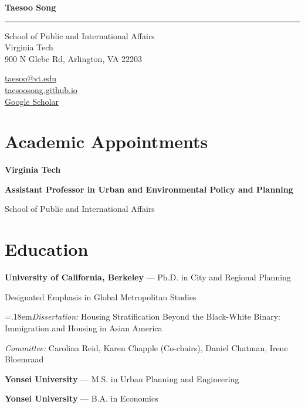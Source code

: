 \documentclass[11pt,letterpaper]{article}
\newcommand{\spitem}{\Needspace{2.6\baselineskip}\item} %
\newcommand{\term}[1]{(#1)}
\newcommand{\namefont}[1]{{\normalfont\bfseries\Huge #1}}
\begin{document}
\raggedright

\namefont{Taesoo Song}
\noindent\rule{\linewidth}{0.8pt}

\begin{minipage}[t]{0.66\textwidth}
School of Public and International Affairs\\
Virginia Tech\\
900 N Glebe Rd, Arlington, VA 22203
\end{minipage}
\begin{minipage}[t]{0.33\textwidth}
\raggedleft
\href{mailto:taesoo@vt.edu}{taesoo@vt.edu}\\
\href{https://taesoosong.github.io}{taesoosong.github.io}\\
\href{https://scholar.google.com/citations?user=2VUTbVcAAAAJ}{Google Scholar}
\end{minipage}

\section{Academic Appointments}
\noindent\textbf{Virginia Tech}\par\vspace{.10\baselineskip}
\begin{tablist}
  \item[2026--] \tab{}\textbf{Assistant Professor in Urban and Environmental Policy and Planning}
    \begin{subpoints}
      \spitem School of Public and International Affairs
    \end{subpoints}
\end{tablist}

\section{Education}
\begin{tablist}
  \item[2026] \tab{}\textbf{University of California, Berkeley} --- Ph.D. in City and Regional Planning
    \begin{subpoints}
      \spitem Designated Emphasis in Global Metropolitan Studies
      \spitem {\spaceskip=.18em\textit{Dissertation:} Housing Stratification Beyond the Black-White Binary: Immigration and Housing in Asian America}
      \spitem \textit{Committee:} Carolina Reid, Karen Chapple (Co-chairs), Daniel Chatman, Irene Bloemraad
    \end{subpoints}

  \item[2019] \tab{}\textbf{Yonsei University} --- M.S. in Urban Planning and Engineering

  \item[2017] \tab{}\textbf{Yonsei University} --- B.A. in Economics
\end{tablist}
\end{document}
